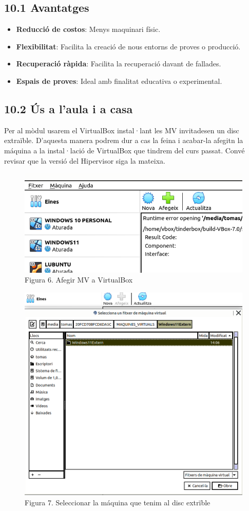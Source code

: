 \documentclass[
  a4paper,
]{article}
\providecommand{\tightlist}{%
  \setlength{\itemsep}{0pt}\setlength{\parskip}{0pt}}
\begin{document}
\subsection{10.1 Avantatges}\label{avantatges}

\begin{itemize}
\tightlist
\item
  \textbf{Reducció de costos}: Menys maquinari físic.
\item
  \textbf{Flexibilitat}: Facilita la creació de nous entorns de proves o
  producció.
\item
  \textbf{Recuperació ràpida}: Facilita la recuperació davant de
  fallades.
\item
  \textbf{Espais de proves}: Ideal amb finalitat educativa o
  experimental.
\end{itemize}

\subsection{10.2 Ús a l'aula i a casa}\label{uxfas-a-laula-i-a-casa}

Per al mòdul usarem el VirtualBox instal·lant les MV invitadesen un disc
extraïble. D'aquesta manera podrem dur a cas la feina i acabar-la
afegitn la máquina a la instal·lació de VirtualBox que tindrem del curs
passat. Convé revisar que la versió del Hipervisor siga la mateixa.

\begin{figure}
\centering
\includegraphics{png/afegeixMV.png}
\caption{Figura 6. Afegir MV a VirtualBox}
\end{figure}

\begin{figure}
\centering
\includegraphics{png/afegeixMV2.png}
\caption{Figura 7. Seleccionar la máquina que tenim al disc extrïble}
\end{figure}
\end{document}
